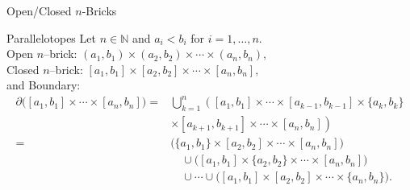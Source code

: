 \begin{frame}{Open/Closed $n$-Bricks}
\vspace{-0.3cm}
\begin{block}{Parallelotopes}
Let $n\in\mathbb{N}$ and $a_i<b_i$ for $i=1,\dots,n$.\\
Open $n$–brick: $(a_1,b_1)\times(a_2,b_2)\times\cdots\times(a_n,b_n),$\\
Closed $n$–brick: $[a_1,b_1]\times[a_2,b_2]\times\cdots\times[a_n,b_n],$\\
and Boundary:
\vspace{-0.3cm}
\begin{align*}
\partial\bigl([a_1,b_1]\times\cdots\times[a_n,b_n]\bigr)
=& \bigcup_{k=1}^n
\left([a_1,b_1]\times\cdots\times[a_{k-1},b_{k-1}]\times\{a_k,b_k\}
\right.\\
&\left.
\times[a_{k+1},b_{k+1}]\times\cdots\times[a_n,b_n]\right) \\
=& \Big(\{a_1,b_1\}\times[a_2,b_2]\times\cdots\times[a_n,b_n]\Big) \\
&\quad \cup \Big([a_1,b_1]\times\{a_2,b_2\}\times\cdots\times[a_n,b_n]\Big) \\
&\quad \cup \cdots \cup \Big([a_1,b_1]\times[a_2,b_2]\times\cdots\times\{a_n,b_n\}\Big).
\end{align*}
\end{block}
\end{frame}


